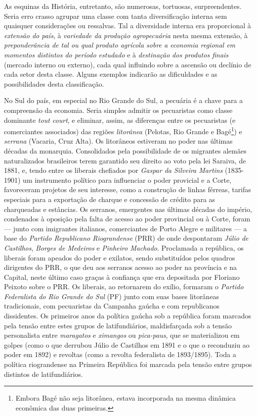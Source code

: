 As esquinas da História, entretanto, são numerosas, tortuosas, surpreendentes. Seria erro crasso agrupar uma classe com tanta diversificação interna sem quaisquer considerações ou ressalvas. Tal a diversidade interna era proporcional à \textit{extensão do país}, à \textit{variedade da produção agropecuária} nesta mesma extensão, à \textit{preponderância de tal ou qual produto agrícola sobre a economia regional em momentos distintos do período estudado} e à \textit{destinação dos produtos finais} (mercado interno ou externo), cada qual influindo sobre a ascensão ou declínio de cada setor desta classe. Alguns exemplos indicarão as dificuldades e as possibilidades desta classificação.

No Sul do país, em especial no Rio Grande do Sul, a pecuária é a chave para a compreensão da economia. Seria simples admitir os pecuaristas como classe dominante \textit{tout court}, e eliminar, assim, as diferenças entre os pecuaristas (e comerciantes associados) das regiões \textit{litorânea} (Pelotas, Rio Grande e Bagé\footnote{Embora Bagé não seja litorânea, estava incorporada na mesma dinâmica econômica das duas primeiras.}) e \textit{serrana} (Vacaria, Cruz Alta). Os litorâneos estiveram no poder nas últimas décadas da monarquia. Consolidados pela possibilidade de os migrantes alemães naturalizados brasileiros terem garantido seu direito ao voto pela lei Saraiva, de 1881, e, tendo entre os liberais chefiados por \textit{Gaspar da Silveira Martins} (1835-1901) um instrumento político para influenciar o poder provicial e a Corte, favoreceram projetos de seu interesse, como a construção de linhas férreas, tarifas especiais para a exportação de charque e concessão de crédito para as charqueadas e estâncias. Os serranos, emergentes nas últimas décadas do império, condenados à oposição pela falta de acesso ao poder provincial ou à Corte, foram --- junto com imigrantes italianos, comerciantes de Porto Alegre e militares --- a base do \textit{Partido Republicano Riograndense} (PRR) de onde despontaram \textit{Júlio de Castilhos}, \textit{Borges de Medeiros} e \textit{Pinheiro Machado}. Proclamada a república, os liberais foram apeados do poder e exilatos, sendo substituídos pelos quadros dirigentes do PRR, o que deu aos serranos acesso ao poder na província e na Capital, neste último caso graças à confiança que era depositada por Floriano Peixoto sobre o PRR. Os liberais, ao retornarem do exílio, formaram o \textit{Partido Federalista do Rio Grande do Sul} (PF) junto com suas bases litorâneas tradicionais, com pecuaristas da Campanha gaúcha e com republicanos dissidentes. Os primeiros anos da política gaúcha sob a república foram marcados pela tensão entre estes grupos de latifundiários, maldisfarçada sob a tensão personalista entre \textit{maragatos} e \textit{ximangos} ou \textit{pica-paus}, que se materializou em golpes (como o que derrubou Júlio de Castilhos em 1891 e o que o reconduziu ao poder em 1892) e revoltas (como a revolta federalista de 1893/1895). Toda a política riograndense na Primeira República foi marcada pela tensão entre grupos distintos de latifundiários.

